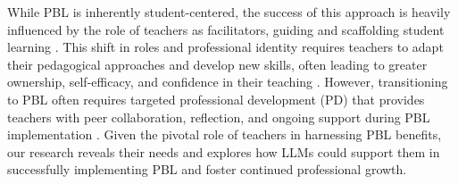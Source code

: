 

While PBL is inherently student-centered, the success of this approach is heavily influenced by the role of teachers as facilitators, guiding and scaffolding student learning
\cite{barron2008teaching}. This shift in roles and professional identity requires teachers to adapt their pedagogical approaches and develop new skills, often leading to greater ownership, self-efficacy, and confidence in their teaching \cite{choi2019does, havice2018evaluating, potvin2021consequential}. However, transitioning to PBL often requires targeted professional development (PD) that provides teachers with peer collaboration, reflection, and ongoing support during PBL implementation \cite{Aitken2019, dunbar2022shifting, blumenfeld1991motivating, quint2018project, park2018equip}. %
Given the pivotal role of teachers in harnessing PBL benefits, our research reveals their needs and explores how LLMs could support them in successfully implementing PBL and foster continued professional growth. 

